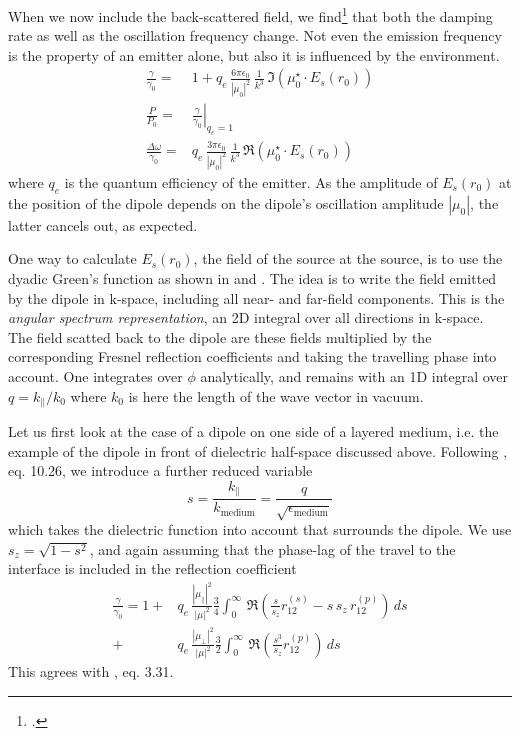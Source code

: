 When we now include the back-scattered field, we find\footcite[chapter 8.5.2]{Novotny-Hecht2012} that both the damping rate as well as the oscillation frequency change. Not even the emission frequency is the property of an emitter alone, but also it is influenced by the environment.
\begin{eqnarray}
 \frac{\gamma}{\gamma_0}  = &
  1 +  q_e \, \frac{6 \pi \epsilon_0}{|\mu_0|^2} \, \frac{1}{k^3} 
  \, \Im \left( \mu_0^\star \cdot E_s(r_0) \right) \\
 \frac{P}{P_0} =  &  \left. \frac{\gamma}{\gamma_0}  \right|_{q_e = 1} \\
 \frac{\Delta \omega}{\gamma_0} = &
 q_e \, \frac{3 \pi \epsilon_0}{|\mu_0|^2} \, \frac{1}{k^3} 
  \, \Re \left( \mu_0^\star \cdot E_s(r_0) \right)
\end{eqnarray}
where $q_e$ is the quantum efficiency of the emitter.
As the amplitude of $ E_s(r_0)$ at the position of the dipole depends on the dipole's oscillation amplitude $|\mu_0|$, the latter cancels out, as expected.

One way to calculate $ E_s(r_0)$, the field of the source at the source, is to use the dyadic Green's function as shown in \cite{Novotny-Hecht2012} and \cite{Hohenester2020}. The idea is to write the  field emitted by the dipole in k-space, including all near- and far-field components. This is the \emph{angular spectrum representation}, an 2D integral over all directions in k-space. The field scatted back to the dipole are these fields multiplied by the corresponding Fresnel reflection coefficients and taking the travelling phase into account. 
One integrates over $\phi$ analytically, and 
remains with an 1D integral over $q = k_\parallel / k_0$ where $k_0$ is here the length of the wave vector in vacuum.

Let us first look at the case of a dipole on one side of a layered medium, i.e. the example of the dipole in front of  dielectric half-space discussed above. Following \cite{Novotny-Hecht2012}, eq. 10.26, we introduce a further reduced variable
\begin{equation}
 s= \frac{k_\parallel}{k_\text{medium}} = \frac{q}{ \sqrt{\epsilon_\text{medium}}}
\end{equation}
which takes the dielectric function into account that surrounds the dipole.
We use $s_z = \sqrt{1 - s^2}$, and again assuming that the phase-lag of the travel to the interface is included in the reflection coefficient
\begin{align}
\frac{\gamma}{\gamma_0} = 1 + &q_e \, \frac{| \mu_\parallel|^2}{|\mu|^2} \frac{3}{4}
\int_0^\infty \, \Re 
\left( \frac{s}{s_z} r_{12}^{(s)} - s \, s_z \, r_{12}^{(p)} 
\right) \, ds \label{eq:decay_single} \\
+ & q_e \,\frac{| \mu_\perp|^2}{|\mu|^2} \frac{3}{2}
\int_0^\infty \, \Re 
\left( \frac{s^3}{s_z} r_{12}^{(p)} 
\right) \, ds  \nonumber 
\end{align}
This agrees with  \cite{Ford_Weber_84}, eq. 3.31.


